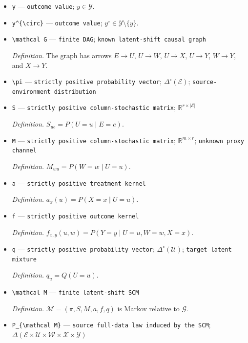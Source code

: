 \documentclass{article}
\begin{document}
\begin{itemize}
  \item \texttt{y} --- \texttt{outcome value}; \(y\in\mathcal Y\).
  \item \texttt{y\textasciicircum{}\{\textbackslash{}\allowbreak{}circ\}\allowbreak{}} --- \texttt{outcome value}; \(y^{\circ}\in\mathcal Y\setminus\{y\}\).
  \item \texttt{\textbackslash{}\allowbreak{}mathcal G} --- \texttt{finite DAG}; \texttt{known latent-\allowbreak{}shift causal graph}
  \par\smallskip\noindent\emph{Definition.} The graph has arrows \(E\to U\), \(U\to W\), \(U\to X\), \(U\to Y\), \(W\to Y\), and \(X\to Y\).
  \item \texttt{\textbackslash{}\allowbreak{}pi} --- \texttt{strictly positive probability vector}; \(\Delta^{\circ}(\mathcal E)\); \texttt{source-\allowbreak{}environment distribution}
  \item \texttt{S} --- \texttt{strictly positive column-\allowbreak{}stochastic matrix}; \(\mathbb R^{r\times\lvert\mathcal E\rvert}\)
  \par\smallskip\noindent\emph{Definition.} \(S_{ue}=P(U=u\mid E=e)\).
  \item \texttt{M} --- \texttt{strictly positive column-\allowbreak{}stochastic matrix}; \(\mathbb R^{m\times r}\); \texttt{unknown proxy channel}
  \par\smallskip\noindent\emph{Definition.} \(M_{wu}=P(W=w\mid U=u)\).
  \item \texttt{a} --- \texttt{strictly positive treatment kernel}
  \par\smallskip\noindent\emph{Definition.} \(a_x(u)=P(X=x\mid U=u)\).
  \item \texttt{f} --- \texttt{strictly positive outcome kernel}
  \par\smallskip\noindent\emph{Definition.} \(f_{x,y}(u,w)=P(Y=y\mid U=u,W=w,X=x)\).
  \item \texttt{q} --- \texttt{strictly positive probability vector}; \(\Delta^{\circ}(\mathcal U)\); \texttt{target latent mixture}
  \par\smallskip\noindent\emph{Definition.} \(q_u=Q(U=u)\).
  \item \texttt{\textbackslash{}\allowbreak{}mathcal M} --- \texttt{finite latent-\allowbreak{}shift SCM}
  \par\smallskip\noindent\emph{Definition.} \(\mathcal M=(\pi,S,M,a,f,q)\) is Markov relative to \(\mathcal G\).
  \item \texttt{P\_\allowbreak{}\{\textbackslash{}\allowbreak{}mathcal M\}\allowbreak{}} --- \texttt{source full-\allowbreak{}data law induced by the SCM}; \(\Delta(\mathcal E\times\mathcal U\times\mathcal W\times\mathcal X\times\mathcal Y)\)

\end{itemize}
\end{document}
